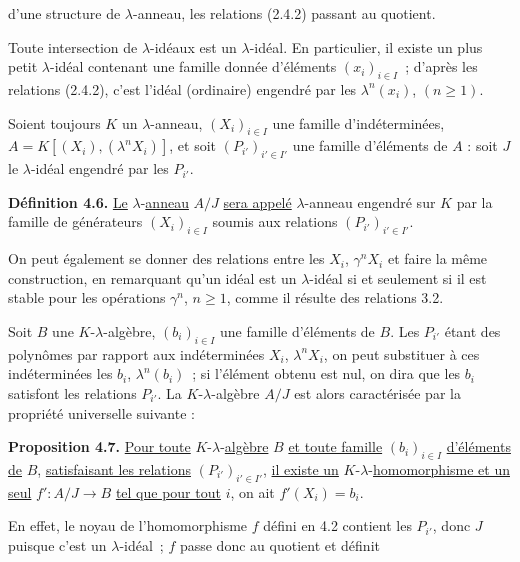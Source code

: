 
d'une
structure de \(\lambda\)-anneau, les relations (2.4.2) passant au quotient.

Toute intersection de \(\lambda\)-idéaux est un \(\lambda\)-idéal. En particulier, il existe un plus petit \(\lambda\)-idéal contenant une famille donnée d'éléments \((x_i)_{i\in I}\)~; d'après les relations (2.4.2), c'est l'idéal (ordinaire) engendré par les \(\lambda^n(x_i)\), \((n\ge1)\).

Soient toujours \(K\) un \(\lambda\)-anneau, \((X_i)_{i\in I}\) une famille d'indéterminées, \(A=K[(X_i),(\lambda^n X_i)]\), et soit \((P_{i'})_{i'\in I'}\) une famille d'éléments de \(A\) : soit \(J\) le \(\lambda\)-idéal engendré par les \(P_{i'}\).

\textbf{Définition 4.6.} \uline{Le} \(\lambda\)-\uline{anneau} \(A/J\) \uline{sera appelé} \(\lambda\)-anneau engendré sur \(K\) par la famille de générateurs \((X_i)_{i\in I}\) soumis aux relations \((P_{i'})_{i'\in I'}\).

On peut également se donner des relations entre les \(X_i\), \(\gamma^n X_i\) et faire la même construction, en remarquant qu'un idéal est un \(\lambda\)-idéal si et seulement si il est stable pour les opérations \(\gamma^n\), \(n\ge1\), comme il résulte des relations 3.2.

Soit \(B\) une \(K\)-\(\lambda\)-algèbre, \((b_i)_{i\in I}\) une famille d'éléments de \(B\). Les \(P_{i'}\) étant des polynômes par rapport aux indéterminées \(X_i\), \(\lambda^n X_i\), on peut substituer à ces indéterminées les \(b_i\), \(\lambda^n(b_i)\)~; si l'élément obtenu est nul, on dira que les \(b_i\) satisfont les relations \(P_{i'}\). La \(K\)-\(\lambda\)-algèbre \(A/J\) est alors caractérisée par la propriété universelle suivante :

\textbf{Proposition 4.7.} \uline{Pour toute} \(K\)-\(\lambda\)-\uline{algèbre} \(B\) \uline{et toute famille} \((b_i)_{i\in I}\) \uline{d'éléments de} \(B\), \uline{satisfaisant les relations} \((P_{i'})_{i'\in I'}\), \uline{il existe un} \(K\)-\(\lambda\)-\uline{homomorphisme et un seul} \(f':A/J\to B\) \uline{tel que pour tout} \(i\), on ait \(f'(X_i)=b_i\).

En effet, le noyau de l'homomorphisme \(f\) défini en 4.2 contient les \(P_{i'}\), donc \(J\) puisque c'est un \(\lambda\)-idéal~; \(f\) passe donc au quotient et définit 
